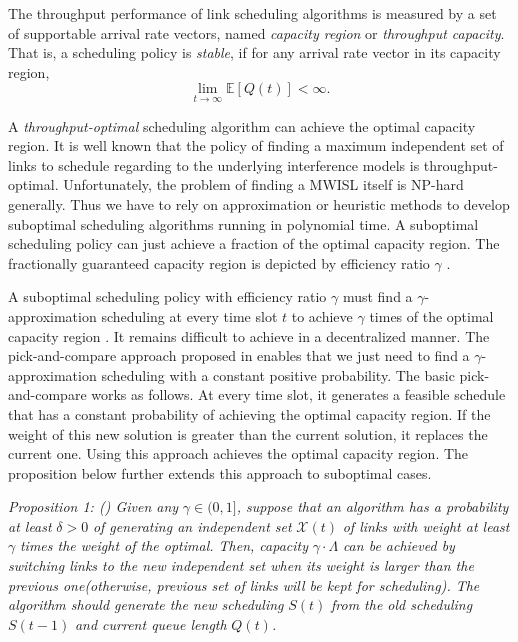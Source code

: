 \documentclass[journal]{IEEEtran}
\begin{document}
 The throughput performance of link scheduling algorithms is measured by a set of supportable arrival rate vectors, named \emph{capacity region} or \emph{ throughput capacity}. That is, a scheduling policy is \emph{stable}, if for any arrival rate vector in its capacity region\cite{S:pick3},
\[    \lim_{ t\rightarrow \infty} \mathbb{E}[{ Q(t)}] < \infty.\]

A \textit{throughput-optimal} scheduling algorithm can achieve the optimal capacity region. It is well known that the policy of finding a maximum independent set of links to schedule regarding to the underlying interference models is throughput-optimal\cite{S:MWM1}. Unfortunately, the problem of finding a MWISL itself is NP-hard generally\cite{sharma2006complexity}. Thus we have to rely on approximation or heuristic methods to develop suboptimal scheduling algorithms running in polynomial time.
A suboptimal scheduling policy can just achieve a fraction of the optimal capacity region. The fractionally guaranteed capacity region is depicted by efficiency ratio $\gamma$ \cite{S:GMS}.

A suboptimal scheduling policy with efficiency ratio $\gamma $
must find a $\gamma $-approximation scheduling at every time slot $t$ to
achieve $\gamma$ times of the optimal capacity region \cite{lin2005info}. It remains difficult to achieve in a decentralized manner. The  pick-and-compare approach proposed in \cite{S:MWM2} enables that we just need to find a $\gamma $-approximation scheduling with a  constant positive probability. The basic pick-and-compare \cite{S:MWM2} works as follows. At every time slot, it generates a feasible schedule that has a constant probability of achieving the optimal capacity region. If the weight of this new solution is greater than the current solution, it replaces the current one. Using this approach achieves the optimal capacity region. The proposition below further extends this approach to suboptimal cases.

\textit{Proposition 1: (\cite{S:pick1}) Given any }$\gamma \in (0,1]$\textit{, suppose that an algorithm has a probability at least }$\delta >0$\textit{ of generating an independent set }$\mathcal{X}(t)$\textit{ of links with weight at least }$\gamma $\textit{ times the weight of the optimal. Then, capacity }$\gamma \cdot \Lambda $\textit{ can be achieved by switching links to the new independent set when its weight is larger than the previous one(otherwise, previous set of links will be kept for scheduling). The algorithm should generate the new scheduling} $S(t)$ \textit{ from the old scheduling }$S(t-1)$\textit{ and current queue length }$Q(t)$\textit{.}
\end{document}

